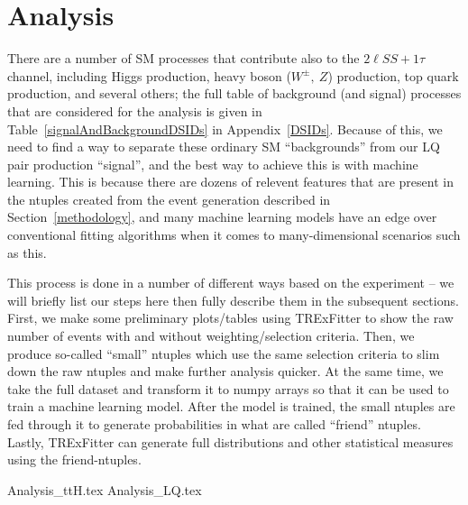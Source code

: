 \section{Analysis}
    There are a number of SM processes that contribute also to the $2\ell SS + 1\tau$ channel, including Higgs production, heavy boson ($W^{\pm},\ Z$) production, top quark production, and several others; the full table of background (and signal) processes that are considered for the analysis is given in Table~\ref{signalAndBackgroundDSIDs} in Appendix~\ref{DSIDs}. Because of this, we need to find a way to separate these ordinary SM ``backgrounds'' from our LQ pair production ``signal'', and the best way to achieve this is with machine learning. This is because there are dozens of relevent features that are present in the ntuples created from the event generation described in Section~\ref{methodology}, and many machine learning models have an edge over conventional fitting algorithms when it comes to many-dimensional scenarios such as this.

    This process is done in a number of different ways based on the experiment -- we will briefly list our steps here then fully describe them in the subsequent sections. First, we make some preliminary plots/tables using TRExFitter to show the raw number of events with and without weighting/selection criteria. Then, we produce so-called ``small'' ntuples which use the same selection criteria to slim down the raw ntuples and make further analysis quicker. At the same time, we take the full dataset and transform it to numpy arrays so that it can be used to train a machine learning model. After the model is trained, the small ntuples are fed through it to generate probabilities in what are called ``friend'' ntuples. Lastly, TRExFitter can generate full distributions and other statistical measures using the friend-ntuples.
    

    {Analysis_ttH.tex}
    {Analysis_LQ.tex}